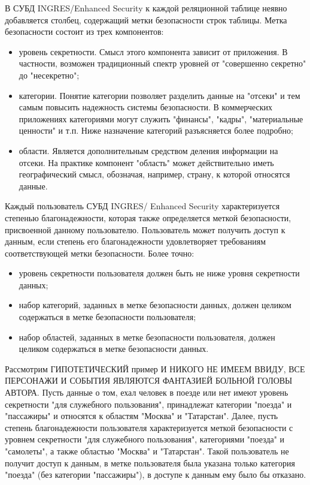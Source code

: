 В СУБД INGRES/Enhanced Security к каждой реляционной таблице неявно добавляется столбец, содержащий
метки безопасности строк таблицы. Метка безопасности состоит из трех компонентов:
\begin{itemize}
    \item уровень секретности. Смысл этого компонента зависит от приложения. В частности, возможен
        традиционный спектр уровней от "совершенно секретно" до "несекретно";
    \item категории. Понятие категории позволяет разделить данные на "отсеки" и тем самым повысить
        надежность системы безопасности. В коммерческих приложениях категориями могут служить
        "финансы", "кадры", "материальные ценности" и т.п. Ниже назначение категорий разъясняется
        более подробно;
    \item области. Является дополнительным средством деления информации на отсеки. На практике
        компонент "область" может действительно иметь географический смысл, обозначая, например,
        страну, к которой относятся данные.
\end{itemize}

Каждый пользователь СУБД INGRES/ Enhanced Security характеризуется степенью благонадежности,
которая также определяется меткой безопасности, присвоенной данному пользователю. Пользователь
может получить доступ к данным, если степень его благонадежности удовлетворяет требованиям
соответствующей метки безопасности. Более точно:
\begin{itemize}
    \item уровень секретности пользователя должен быть не ниже уровня секретности данных;
    \item набор категорий, заданных в метке безопасности данных, должен целиком содержаться в метке
        безопасности пользователя;
    \item набор областей, заданных в метке безопасности пользователя, должен целиком содержаться в
        метке безопасности данных.
\end{itemize}

Рассмотрим ГИПОТЕТИЧЕСКИЙ пример И НИКОГО НЕ ИМЕЕМ ВВИДУ, ВСЕ ПЕРСОНАЖИ И СОБЫТИЯ ЯВЛЯЮТСЯ
ФАНТАЗИЕЙ БОЛЬНОЙ ГОЛОВЫ АВТОРА. Пусть данные о том, ехал человек в поезде или нет имеют уровень
секретности "для служебного пользования", принадлежат категории "поезда" и "пассажиры" и относятся
к областям "Москва" и "Татарстан". Далее, пусть степень благонадежности пользователя
характеризуется меткой безопасности с уровнем секретности "для служебного пользования", категориями
"поезда" и "самолеты", а также областью "Москва" и "Татарстан". Такой пользователь не получит
доступ к данным, в метке пользователя была указана только категория "поезда" (без категории
"пассажиры"), в доступе к данным ему было бы отказано.


